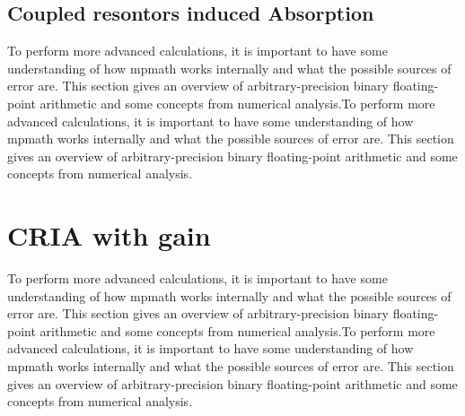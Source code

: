 \subsection{Coupled resontors induced Absorption}

To perform more advanced calculations, it is important to have some understanding of how mpmath works internally and what the possible sources of error are. This section gives an overview of arbitrary-precision binary floating-point arithmetic and some concepts from numerical analysis.To perform more advanced calculations, it is important to have some understanding of how mpmath works internally and what the possible sources of error are. This section gives an overview of arbitrary-precision binary floating-point arithmetic and some concepts from numerical analysis.
\section{CRIA with gain}
To perform more advanced calculations, it is important to have some understanding of how mpmath works internally and what the possible sources of error are. This section gives an overview of arbitrary-precision binary floating-point arithmetic and some concepts from numerical analysis.To perform more advanced calculations, it is important to have some understanding of how mpmath works internally and what the possible sources of error are. This section gives an overview of arbitrary-precision binary floating-point arithmetic and some concepts from numerical analysis.